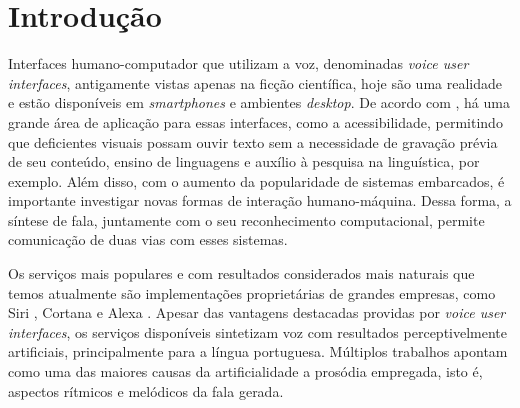 


\chapter{Introdução}

Interfaces humano-computador que utilizam a voz, denominadas \emph{voice user
  interfaces}, antigamente vistas apenas na ficção científica, hoje são uma
realidade e estão disponíveis em \emph{smartphones} e ambientes \emph{desktop}.
De acordo com , há uma grande área de aplicação
para essas interfaces, como a acessibilidade, permitindo que
deficientes visuais possam ouvir texto sem a necessidade de gravação prévia de
seu conteúdo, ensino de linguagens e auxílio à pesquisa na linguística, por
exemplo. Além disso, com o aumento da popularidade de sistemas embarcados, é
importante investigar novas formas de interação humano-máquina. Dessa forma, a
síntese de fala, juntamente com o seu reconhecimento computacional, permite
comunicação de duas vias com esses sistemas.


Os serviços mais populares e com resultados considerados mais naturais que temos
atualmente são implementações proprietárias de grandes empresas, como Siri
\cite{siri}, Cortana \cite{cortana} e Alexa \cite{alexa}. Apesar das vantagens
destacadas providas por \emph{voice user interfaces}, os serviços
disponíveis sintetizam voz com resultados perceptivelmente artificiais,
principalmente para a língua portuguesa. Múltiplos trabalhos
\cite{hirschberg,prosodysurvey,taylor2009} apontam como uma das maiores causas
da artificialidade a prosódia empregada, isto é, aspectos rítmicos e melódicos
da fala gerada.

